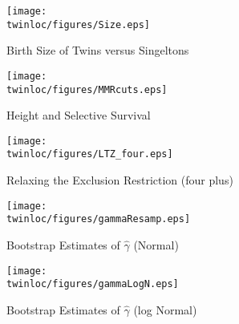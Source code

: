 
\begin{figure}[htpb!]
\begin{center}
\caption{Birth Size of Twins versus Singeltons}
\label{TWINfig:Size}
\texttt{[image: \\twinloc/figures/Size.eps]} 
\end{center}
\end{figure}

\begin{figure}[htpb!]
\begin{center}
\caption{Height and Selective Survival}
\label{TWINfig:survival}
\texttt{[image: \\twinloc/figures/MMRcuts.eps]} 
\end{center}
\end{figure}

\begin{figure}[htpb!]
\begin{center}
\caption{Relaxing the Exclusion Restriction (four plus)}
\label{TWINfig:ltz4}
\texttt{[image: \\twinloc/figures/LTZ\_four.eps]} 
\end{center}
\end{figure}

\begin{subfigures}
\begin{center}
\begin{figure}
\caption{Bootstrap Estimates of $\hat\gamma$ (Normal)}
\label{TWINfig:gammaBootsN}
\texttt{[image: \\twinloc/figures/gammaResamp.eps]} 
\end{figure}

\begin{figure}
\caption{Bootstrap Estimates of $\hat\gamma$ (log Normal)}
\label{TWINfig:gammaBootsL}
\texttt{[image: \\twinloc/figures/gammaLogN.eps]} 
\end{figure}
\end{center}
\end{subfigures}
